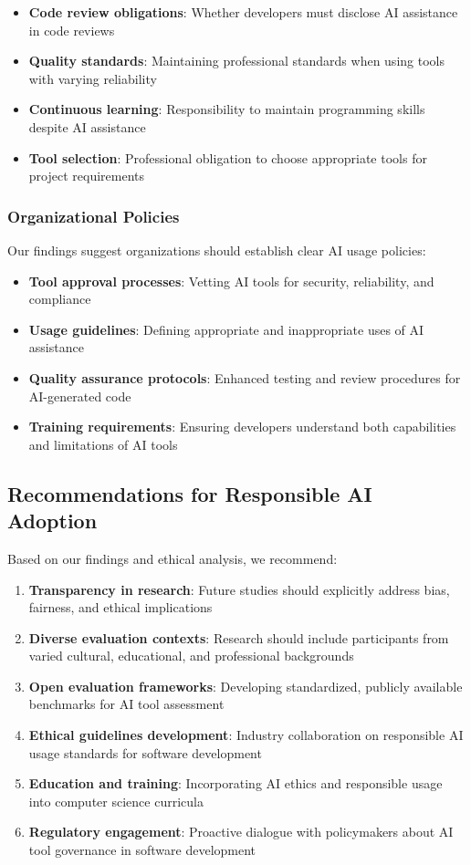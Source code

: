 \documentclass[conference]{IEEEtran}
\begin{document}
\begin{itemize}
    \item \textbf{Code review obligations}: Whether developers must disclose AI assistance in code reviews
    \item \textbf{Quality standards}: Maintaining professional standards when using tools with varying reliability
    \item \textbf{Continuous learning}: Responsibility to maintain programming skills despite AI assistance
    \item \textbf{Tool selection}: Professional obligation to choose appropriate tools for project requirements
\end{itemize}

\subsubsection{Organizational Policies}
Our findings suggest organizations should establish clear AI usage policies:

\begin{itemize}
    \item \textbf{Tool approval processes}: Vetting AI tools for security, reliability, and compliance
    \item \textbf{Usage guidelines}: Defining appropriate and inappropriate uses of AI assistance
    \item \textbf{Quality assurance protocols}: Enhanced testing and review procedures for AI-generated code
    \item \textbf{Training requirements}: Ensuring developers understand both capabilities and limitations of AI tools
\end{itemize}

\subsection{Recommendations for Responsible AI Adoption}

Based on our findings and ethical analysis, we recommend:

\begin{enumerate}
    \item \textbf{Transparency in research}: Future studies should explicitly address bias, fairness, and ethical implications
    \item \textbf{Diverse evaluation contexts}: Research should include participants from varied cultural, educational, and professional backgrounds
    \item \textbf{Open evaluation frameworks}: Developing standardized, publicly available benchmarks for AI tool assessment
    \item \textbf{Ethical guidelines development}: Industry collaboration on responsible AI usage standards for software development
    \item \textbf{Education and training}: Incorporating AI ethics and responsible usage into computer science curricula
    \item \textbf{Regulatory engagement}: Proactive dialogue with policymakers about AI tool governance in software development
\end{enumerate}
\end{document}

